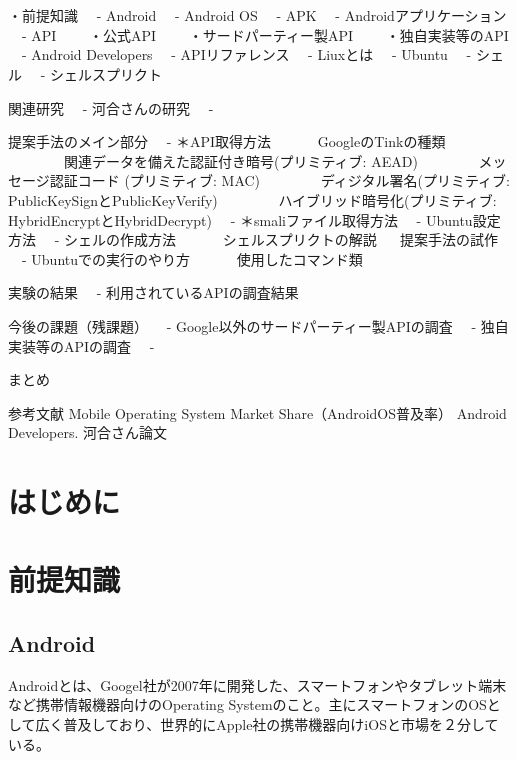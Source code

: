 \documentclass[a4j]{jarticle}
\begin{document}
\section{}
\subsection{}


\section{}
\subsection{}


・前提知識
　- Android
　- Android OS
　- APK
　- Androidアプリケーション
　- API
　　・公式API
　　・サードパーティー製API
　　・独自実装等のAPI
　- Android Developers
　- APIリファレンス
　- Liuxとは
　- Ubuntu
　- シェル
　- シェルスプリクト

関連研究
　- 河合さんの研究
　- 

提案手法のメイン部分
　- ＊API取得方法
　　　GoogleのTinkの種類
　　　　関連データを備えた認証付き暗号(プリミティブ: AEAD)
　　　　メッセージ認証コード (プリミティブ: MAC)
　　　　ディジタル署名(プリミティブ: PublicKeySignとPublicKeyVerify)
　　　　ハイブリッド暗号化(プリミティブ: HybridEncryptとHybridDecrypt)
　- ＊smaliファイル取得方法
　- Ubuntu設定方法
　- シェルの作成方法
　　　シェルスプリクトの解説
　
提案手法の試作
　- Ubuntuでの実行のやり方
　　　使用したコマンド類

実験の結果
　- 利用されているAPIの調査結果
　　　

今後の課題（残課題）
　- Google以外のサードパーティー製APIの調査
　- 独自実装等のAPIの調査
　- 

まとめ

参考文献
Mobile Operating System Market Share（AndroidOS普及率）
Android Developers. 
河合さん論文




\newpage
\section{はじめに} 

\newpage
\section{前提知識}
\subsection{Android} 
Androidとは、Googel社が2007年に開発した、スマートフォンやタブレット端末など携帯情報機器向けのOperating Systemのこと。主にスマートフォンのOSとして広く普及しており、世界的にApple社の携帯機器向けiOSと市場を２分している。
\end{document}
